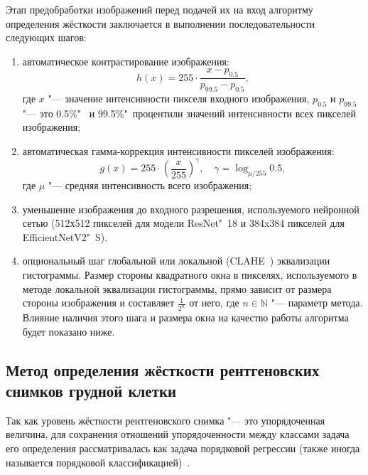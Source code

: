 Этап предобработки изображений перед подачей их на вход алгоритму определения жёсткости заключается в выполнении последовательности следующих шагов:
\begin{enumerate}
	\item автоматическое контрастирование изображения:
	\begin{equation}
	h \left( x \right) = 255 \cdot \frac{x - p_{0.5}}{p_{99.5} - p_{0.5}}, \nonumber
	\end{equation}
	где $x$ "--- значение интенсивности пикселя входного изображения, $p_{0.5}$ и $p_{99.5}$ "--- это 0.5\%"~ и 99.5\%"~процентили значений интенсивности всех пикселей изображения;
	\item автоматическая гамма-коррекция интенсивности пикселей изображения:
	\begin{equation}
	g \left( x \right) = 255 \cdot {\left( \frac{x}{255} \right)}^{\gamma}, \quad \gamma = \log_{\mu / 255}{0.5}, \nonumber
	\end{equation}
	где $\mu$ "--- средняя интенсивность всего изображения;
	\item уменьшение изображения до входного разрешения, используемого нейронной сетью (512х512 пикселей для модели ResNet"~18 и 384x384 пикселей для EfficientNetV2"~S).
	\item опциональный шаг глобальной или локальной (CLAHE~\cite{pizer1987adaptive}) эквализации гистограммы. Размер стороны квадратного окна  в пикселях, используемого в методе локальной эквализации гистограммы, прямо зависит от размера стороны изображения и составляет $\frac{1}{2^n}$ от него, где $n\in\mathbb{N}$ "--- параметр метода. Влияние наличия этого шага и размера окна на качество работы алгоритма будет показано ниже.
\end{enumerate}

\subsection{Метод определения жёсткости рентгеновских снимков грудной клетки}

Так как уровень жёсткости рентгеновского снимка "--- это упорядоченная величина, для сохранения отношений упорядоченности между классами задача его определения рассматривалась как задача порядковой регрессии (также иногда называется порядковой классификацией)~\cite{7161338, 353a0d24-9c24-3a11-a330-afc86b9c39c8}.

